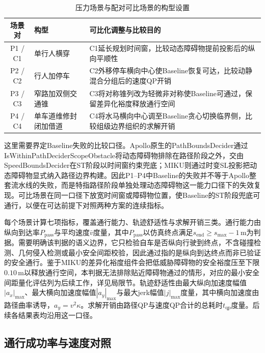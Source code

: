 \documentclass[a4paper,11pt]{ctexart}
\theoremstyle{definition}
\begin{document}
\begin{table}[htbp]
\centering
\caption{压力场景与配对可比场景的构型设置}
\label{tab:exp_scenarios}
\small
\begin{tabular}{c l p{7.4cm}}
\toprule
\textbf{场景对} & \textbf{构型} & \textbf{可比化调整与比较目的} \\
\midrule
P1 / C1 & 单行人横穿 & C1延长规划时间窗，比较动态障碍物提前投影后的纵向平顺性 \\
P2 / C2 & 行人加停车 & C2外移停车横向中心使Baseline恢复可达，比较动静混合分组后的速度QP开销 \\
P3 / C3 & 窄路加双侧交通锥 & C3将对称锥列改为轻微非对称使Baseline可通过，保留差异化裕度释放通行空间 \\
P4 / C4 & 单车道维修封闭加借道 & C4将水马横向中心调至Baseline贪心切换临界侧，比较组级边界组织的求解开销 \\
\bottomrule
\end{tabular}
\end{table}

这里需要界定Baseline失败的比较口径。Apollo原生的PathBoundsDecider通过IsWithinPathDeciderScopeObstacle将动态障碍物排除在路径阶段之外，交由SpeedBoundsDecider在ST阶段以时间窗约束兜底；MIKU则通过时变SL投影把动态障碍物显式纳入路径边界构建。因此P1--P4中Baseline的失败并不等于Apollo整套流水线的失败，而是特指路径阶段单独处理动态障碍物这一能力口径下的失效复现。可比场景在同一口径下放宽时间窗或障碍物位置，使Baseline的ST阶段兜底可通行，以便在可达前提下对照两种方案的连续指标。

每个场景计算七项指标，覆盖通行能力、轨迹舒适性与求解开销三类。通行能力由纵向到达率$P_{\mathrm{pass}}$与平均速度$\bar v$度量，其中$P_{\mathrm{pass}}$以仿真终点满足$s_{\mathrm{end}} \geq s_{\max} - 1$\,m为判据。需要明确该判据的语义边界，它只检验自车是否纵向行驶到终点，不含碰撞检测、几何侵入检测或最小安全间距校验，因此通过指的是纵向到达终点而非已验证的安全通行。鉴于MIKU的差异化裕度组件会把低威胁障碍物的安全裕度压至下限$0.10$\,m以释放通行空间，本判据无法排除贴近障碍物通过的情形，对应的最小安全间距量化评估列为后续工作，详见局限节。轨迹舒适性由最大纵向加速度幅值$|a_x|_{\max}$、最大横向加速度幅值$|a_y|_{\max}$与最大jerk幅值$|j|_{\max}$度量，其中横向加速度由路径曲率诱导，$a_y = v^2 \kappa$。求解开销由路径QP与速度QP合计的总耗时$t_{\mathrm{qp}}$度量。后续各结果表均沿用这一口径。

\subsection{通行成功率与速度对照}
\label{subsec:exp_passrate}
\end{document}
